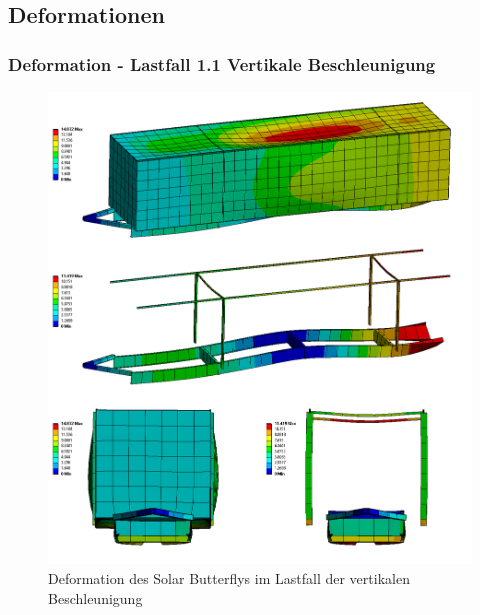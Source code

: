   \newpage

\subsection{Deformationen}
\label{FEM Deformation}
\subsubsection{Deformation - Lastfall 1.1 Vertikale Beschleunigung}
\begin{figure}[H]
  \centering
  \includegraphics[width=1\linewidth]{04_figures/FEM 1.1.png}
  \caption{Deformation des Solar Butterflys im Lastfall der vertikalen Beschleunigung}
  \label{FEM 1.1}
\end{figure}

